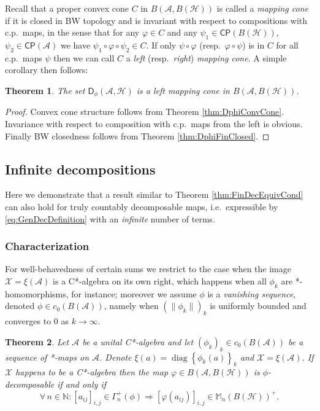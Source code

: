 \documentclass[reqno]{amsart}
\newtheorem{theorem}{Theorem}
\theoremstyle{plain}
\numberwithin{equation}{section}
\numberwithin{theorem}{section}
\numberwithin{lemma}{section}
\numberwithin{definition}{section}
\numberwithin{corollary}{section}
\numberwithin{remark}{section}
\newcommand{\naturals}{\mathbb{N}}
\newcommand{\hilbert}{\mathcal{H}}
\newcommand{\matra}[2]{\mathbb{M}_{#1}(#2)}
\newcommand{\cpe}[1]{\mathsf{CP}(#1)}
\newcommand{\gdec}[3]{\mathsf{D}_{#1}(#2,#3)}
\begin{document}
Recall that a proper convex cone $C$ in $B(\mathscr{A},B(\hilbert))$ is called a \emph{mapping cone} if it is closed in BW topology and is invariant with respect to compositions with c.p.~maps, in the sense that for any $\varphi \in C$ and any  $\psi_1 \in \cpe{B(\hilbert)}$, $\psi_2 \in \cpe{\mathscr{A}}$ we have $\psi_1 \circ \varphi \circ \psi_2 \in C$. If only $\psi\circ\varphi$ (resp.~$\varphi\circ\psi$) is in $C$ for all c.p.~maps $\psi$ then we can call $C$ a \emph{left} (resp.~\emph{right}) \emph{mapping cone}. A simple corollary then follows:

\begin{theorem}\label{thm:DphiFinMapCone}
    The set $\gdec{\phi}{\mathscr{A}}{\hilbert}$ is a left mapping cone in $B(\mathscr{A},B(\hilbert))$.
\end{theorem}

\begin{proof}
    Convex cone structure follows from Theorem \ref{thm:DphiConvCone}. Invariance with respect to composition with c.p.~maps from the left is obvious. Finally BW closedness follows from Theorem \ref{thm:DphiFinClosed}.
\end{proof}

\subsection{Infinite decompositions}
\label{sec:InfDM}

Here we demonstrate that a result similar to Theorem \ref{thm:FinDecEquivCond} can also hold for truly countably decomposable maps, i.e.~expressible by \eqref{eq:GenDecDefinition} with an \emph{infinite} number of terms.

\subsubsection{Characterization}

For well-behavedness of certain sums we restrict to the case when the image $\mathscr{X} = \xi(\mathscr{A})$ is a C*-algebra on its own right, which happens when all $\phi_k$ are *-homomorphisms, for instance; moreover we assume $\phi$ is a \emph{vanishing sequence}, denoted $\phi \in c_0 (B(\mathscr{A}))$, namely when $\left(\|\phi_k\|\right)_k$ is uniformly bounded and converges to $0$ as $k\to\infty$.

\begin{theorem}\label{thm:GenDecEquivCond}
    Let $\mathscr{A}$ be a unital C*-algebra and let $\left(\phi_k\right)_k \in c_0(B(\mathscr{A}))$ be a sequence of *-maps on $\mathscr{A}$. Denote $\xi(a) = \operatorname{diag}{\left\{\phi_k (a)\right\}_{k}}$ and $\mathscr{X} = \xi(\mathscr{A})$. If $\mathscr{X}$ happens to be a C*-algebra then the map $\varphi \in B(\mathscr{A},B(\hilbert))$ is $\phi$-decomposable if and only if 
    \begin{equation}\label{eq:OnlyIfAssumInfinite}
        \forall \, n\in\naturals : \left[a_{ij}\right]_{i,j} \in \Gamma_{n}^{+}(\phi) \Rightarrow \left[\varphi(a_{ij})\right]_{i,j} \in \matra{n}{B(\hilbert)}^+ .
    \end{equation}
\end{theorem}
\end{document}
